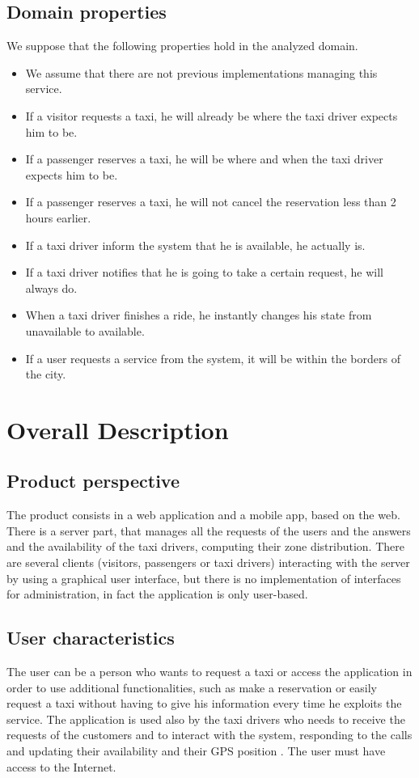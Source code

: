 \documentclass[18pt,oneside,a4paper, titlepage]{article}
\begin{document}
	\subsection{Domain properties}
	We suppose that the following properties hold in the analyzed domain.
	\begin{itemize}
		\item We assume that there are not previous implementations managing this service.
		\item If a visitor requests a taxi, he will already be where the taxi driver expects him to be.
		\item If a passenger reserves a taxi, he will be where and when the taxi driver expects him to be.
		\item If a passenger reserves a taxi, he will not cancel the reservation less than 2 hours earlier.
		\item If a taxi driver inform the system that he is available, he actually is.
		\item If a taxi driver notifies that he is going to take a certain request, he will always do.
		\item When a taxi driver finishes a ride, he instantly changes his state from unavailable to available.
		\item If a user requests a service from the system, it will be within the borders of the city.
		
	\end{itemize}


\newpage
\section{Overall Description}
	\subsection{Product perspective}
	The product consists in a web application and a mobile app, based on the web. There is a server part, that manages all the requests of the users and the answers and the availability of the taxi drivers, computing their zone distribution. There are several clients (visitors, passengers or taxi drivers) interacting with the server by using a graphical user interface, but there is no implementation of interfaces for administration, in fact the application is only user-based.
	
	\subsection{User characteristics}
	The user can be a person who wants to request a taxi or access the application in order to use additional functionalities, such as make a reservation or easily request a taxi without having to give his information every time he exploits the service.
	The application is used also by the taxi drivers who needs to receive the requests of the customers and to interact with the system, responding to the calls and updating their availability and their GPS position .
	The user must have access to the Internet.
	
\end{document}
